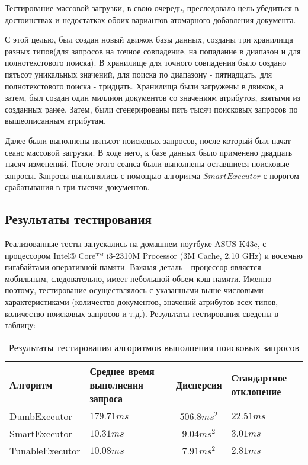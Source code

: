 \documentclass{matmex-diploma}
\begin{document}
        Тестирование массовой загрузки, в свою очередь, преследовало цель убедиться в достоинствах и недостатках обоих вариантов атомарного добавления документа.
        
        С этой целью, был создан новый движок базы данных, созданы три хранилища разных типов(для запросов на точное совпадение, на попадание в диапазон и для полнотекстового поиска). В хранилище для точного совпадения было создано пятьсот уникальных значений, для поиска по диапазону - пятнадцать, для полнотекстового поиска - тридцать. Хранилища были загружены в движок, а затем, был создан один миллион документов со значениям атрибутов, взятыми из созданных ранее. Затем, были сгенерированы пять тысяч поисковых запросов по вышеописанным атрибутам.
        
        Далее были выполнены пятьсот поисковых запросов, после который был начат сеанс массовой загрузки. В ходе него, к базе данных было применено двадцать тысяч изменений. После этого сеанса были выполнены оставшиеся поисковые запросы. Запросы выполнялись с помощью алгоритма $SmartExecutor$ с порогом срабатывания в три тысячи документов.
        
        
    \subsection{Результаты тестирования}
        Реализованные тесты запускались на домашнем ноутбуке ASUS K43e, с процессором Intel® Core™ i3-2310M Processor (3M Cache, 2.10 GHz) и восемью гигабайтами оперативной памяти. Важная деталь - процессор является мобильным, следовательно, имеет небольшой объем кэш-памяти. Именно поэтому, тестирование осуществлялось с указанными выше числовыми характеристиками (количество документов, значений атрибутов всех типов, количество поисковых запросов и т.д.).  
        Результаты тестирования сведены в таблицу:
        \begin{table}[H]
            \caption{Результаты тестирования алгоритмов выполнения поисковых запросов}
            \centering
                \begin{tabularx}{\textwidth}{| l | X | c | X |}
                    \hline
                    Алгоритм  & Среднее время выполнения запроса  & Дисперсия & Стандартное отклонение  \\
                    \hline
                    DumbExecutor & $179.71 ms$ & $506.8 ms^2$ & $22.51 ms$  \\
                    \hline
                    SmartExecutor & $10.31  ms$ & $9.04 ms^2$ & $3.01 ms$  \\
                    \hline
                    TunableExecutor & $10.08 ms$ & $7.91 ms^2$ & $2.81 ms$  \\
                    \hline                    
                \end{tabularx}  
        \end{table}
        
\end{document}
